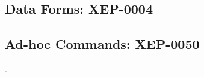 \subsection{Data Forms: XEP-0004}
\label{sec:Data-Forms}


\subsection{Ad-hoc Commands: XEP-0050}.
\label{sec:Adhoc-Commands}


